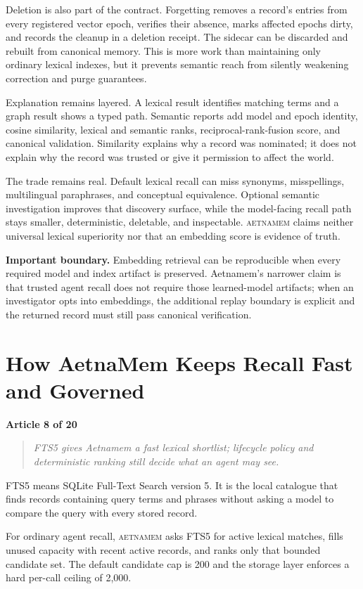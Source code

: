 \documentclass[11pt]{article}
\newcommand{\system}{\textsc{aetnamem}}
\newcommand{\articlelabel}[1]{%
  \noindent\colorbox{aetnaTeal!10}{%
    \parbox{0.96\textwidth}{\color{aetnaInk}\small\textbf{Article #1 of 20}}}%
  \par\medskip}
\newcommand{\coreidea}[1]{%
  \begin{quote}\color{aetnaTeal}\large\itshape #1\end{quote}}
\newcommand{\boundary}[1]{%
  \par\smallskip\noindent\textbf{Important boundary.} #1}
\begin{document}
Deletion is also part of the contract. Forgetting removes a record's entries
from every registered vector epoch, verifies their absence, marks affected
epochs dirty, and records the cleanup in a deletion receipt. The sidecar can
be discarded and rebuilt from canonical memory. This is more work than
maintaining only ordinary lexical indexes, but it prevents semantic reach
from silently weakening correction and purge guarantees.

Explanation remains layered. A lexical result identifies matching terms and a
graph result shows a typed path. Semantic reports add model and epoch identity,
cosine similarity, lexical and semantic ranks, reciprocal-rank-fusion score,
and canonical validation. Similarity explains why a record was nominated; it
does not explain why the record was trusted or give it permission to affect
the world.

The trade remains real. Default lexical recall can miss synonyms,
misspellings, multilingual paraphrases, and conceptual equivalence. Optional
semantic investigation improves that discovery surface, while the
model-facing recall path stays smaller, deterministic, deletable, and
inspectable. \system{} claims neither universal lexical superiority nor that
an embedding score is evidence of truth.

\boundary{Embedding retrieval can be reproducible when every required model
and index artifact is preserved. Aetnamem's narrower claim is that trusted
agent recall does not require those learned-model artifacts; when an
investigator opts into embeddings, the additional replay boundary is explicit
and the returned record must still pass canonical verification.}

\clearpage
\section{How AetnaMem Keeps Recall Fast and Governed}
\articlelabel{8}
\coreidea{FTS5 gives Aetnamem a fast lexical shortlist; lifecycle policy and
deterministic ranking still decide what an agent may see.}

FTS5 means SQLite Full-Text Search version 5. It is the local catalogue that
finds records containing query terms and phrases without asking a model to
compare the query with every stored record.

For ordinary agent recall, \system{} asks FTS5 for active lexical matches,
fills unused capacity with recent active records, and ranks only that bounded
candidate set. The default candidate cap is 200 and the storage layer enforces
a hard per-call ceiling of 2,000.
\end{document}
